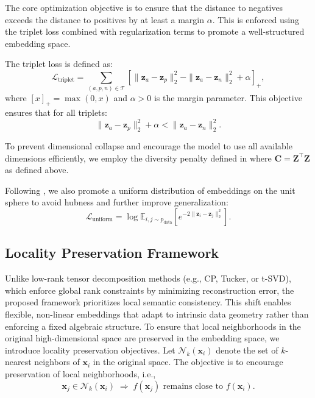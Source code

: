 \documentclass[a4paper,12pt,reqno]{amsart}
\newcommand{\revisedd}[1]{{\color{black}{#1}}}
\theoremstyle{definition}
\theoremstyle{remark}
\begin{document}
The core optimization objective is to ensure that the distance to negatives exceeds the distance to positives by at least a margin $\alpha$. This is enforced using the triplet loss combined with regularization terms to promote a well-structured embedding space.

The triplet loss is defined as:
\begin{equation}
	\mathcal{L}_{\text{triplet}} = \sum_{(a,p,n) \in \mathcal{T}} \left[ \|\mathbf{z}_a - \mathbf{z}_p\|_2^2 - \|\mathbf{z}_a - \mathbf{z}_n\|_2^2 + \alpha \right]_+,
\end{equation}
where $[x]_+ = \max(0, x)$ and $\alpha > 0$ is the margin parameter. This objective ensures that for all triplets:
\begin{equation}
	\|\mathbf{z}_a - \mathbf{z}_p\|_2^2 + \alpha < \|\mathbf{z}_a - \mathbf{z}_n\|_2^2.
\end{equation}

To prevent dimensional collapse and encourage the model to use all available dimensions efficiently, we employ the diversity penalty defined in \revisedd{Proposition~\ref{prop:embedding_rank}}
where $\mathbf{C} = \mathbf{Z}^\top \mathbf{Z}$ as defined above.


Following \cite{wang2020understanding}, we also promote a uniform distribution of embeddings on the unit sphere to avoid hubness and further improve generalization:
\begin{equation}
	\mathcal{L}_{\text{uniform}} = \log \mathbb{E}_{i,j \sim p_{\text{data}}} \left[ e^{-2\|\mathbf{z}_i - \mathbf{z}_j\|_2^2} \right].
\end{equation}

\subsection{Locality Preservation Framework}
	Unlike low-rank tensor decomposition methods (e.g., CP, Tucker, or t-SVD), which enforce global rank constraints by minimizing reconstruction error, the proposed framework prioritizes local semantic consistency. This shift enables flexible, non-linear embeddings that adapt to intrinsic data geometry rather than enforcing a fixed algebraic structure.
To ensure that local neighborhoods in the original high-dimensional space are preserved in the embedding space, we introduce locality preservation objectives. Let $\mathcal{N}_k(\mathbf{x}_i)$ denote the set of $k$-nearest neighbors of $\mathbf{x}_i$ in the original space. The objective is to encourage preservation of local neighborhoods, i.e.,
	\begin{equation}
	\mathbf{x}_j \in \mathcal{N}_k(\mathbf{x}_i) \;\Rightarrow\; f(\mathbf{x}_j) \text{ remains close to } f(\mathbf{x}_i).
\end{equation}
\end{document}

